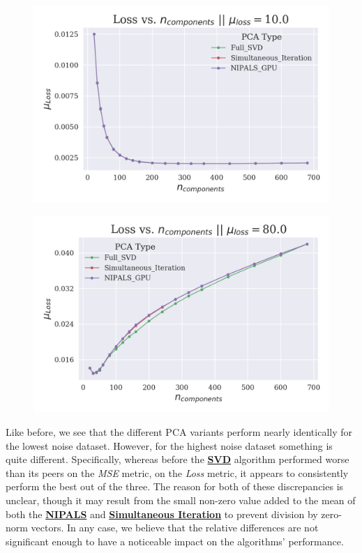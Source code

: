 \documentclass[12pt]{article}
\begin{document}
\begin{figure}[H]
\centering
\begin{minipage}{.45\textwidth}
  \centering
  \includegraphics[width=\linewidth]{Noise10Loss.png}
  \label{Noise10Loss}
\end{minipage}%
\quad
\begin{minipage}{.45\textwidth}
  \centering
  \includegraphics[width=\linewidth]{Noise80Loss.png}
  \label{Noise80Loss}
\end{minipage}
\end{figure}

Like before, we see that the different PCA variants perform nearly identically for the lowest noise dataset. However, for the highest noise dataset something is quite different. Specifically, whereas before the \textbf{\hyperref[3.2]{SVD}} algorithm performed worse than its peers on the \textit{MSE} metric, on the \textit{Loss} metric, it appears to consistently perform the best out of the three. The reason for both of these discrepancies is unclear, though it may result from the small non-zero value added to the mean of both the \textbf{\hyperref[3.1]{NIPALS}} and  \textbf{\hyperref[3.3]{Simultaneous Iteration}} to prevent division by zero-norm vectors. In any case, we believe that the relative differences are not significant enough to have a noticeable impact on the algorithms' performance. 
\end{document}
